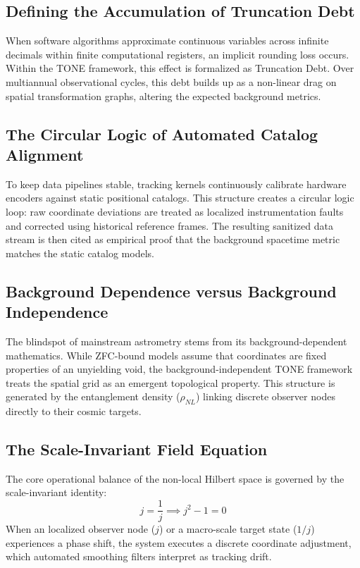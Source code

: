 \documentclass[11pt,a4paper]{article}
\theoremstyle{plain}
\theoremstyle{definition}
\begin{document}
\subsection{Defining the Accumulation of Truncation Debt}
When software algorithms approximate continuous variables across infinite decimals within finite computational registers, an implicit rounding loss occurs. Within the TONE framework, this effect is formalized as Truncation Debt. Over multiannual observational cycles, this debt builds up as a non-linear drag on spatial transformation graphs, altering the expected background metrics.

\subsection{The Circular Logic of Automated Catalog Alignment}
To keep data pipelines stable, tracking kernels continuously calibrate hardware encoders against static positional catalogs. This structure creates a circular logic loop: raw coordinate deviations are treated as localized instrumentation faults and corrected using historical reference frames. The resulting sanitized data stream is then cited as empirical proof that the background spacetime metric matches the static catalog models.

\subsection{Background Dependence versus Background Independence}
The blindspot of mainstream astrometry stems from its background-dependent mathematics. While ZFC-bound models assume that coordinates are fixed properties of an unyielding void, the background-independent TONE framework treats the spatial grid as an emergent topological property. This structure is generated by the entanglement density ($\rho_{NL}$) linking discrete observer nodes directly to their cosmic targets.

\subsection{The Scale-Invariant Field Equation}
The core operational balance of the non-local Hilbert space is governed by the scale-invariant identity:
\begin{equation}
j = \frac{1}{j} \implies j^2 - 1 = 0
\end{equation}
When an localized observer node ($j$) or a macro-scale target state ($1/j$) experiences a phase shift, the system executes a discrete coordinate adjustment, which automated smoothing filters interpret as tracking drift.
\end{document}
